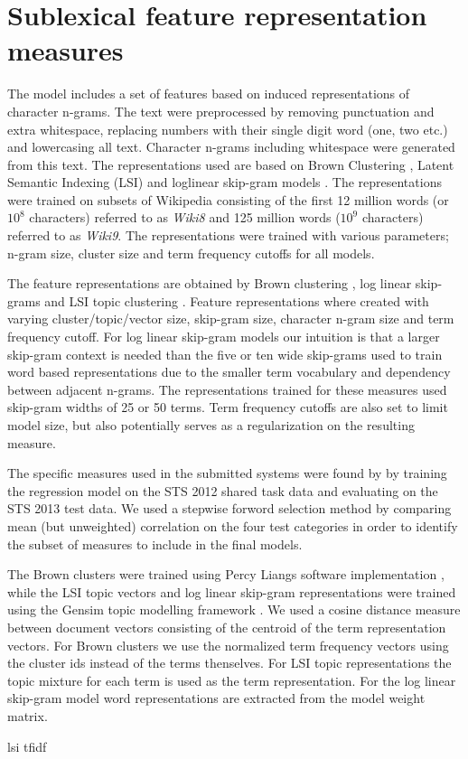 \section{Sublexical feature representation measures}
\label{subrep-features}

The model includes a set of features based on induced representations of character n-grams. The text were preprocessed by removing punctuation and extra whitespace, replacing numbers with their single digit word (one, two etc.) and lowercasing all text. Character n-grams including whitespace were generated from this text. The representations used are based on Brown Clustering \cite{}, Latent Semantic Indexing (LSI) \cite{} and loglinear skip-gram models \cite{}. The representations were trained on subsets of Wikipedia consisting of the first 12 million words (or $10^8$ characters) referred to as {\it Wiki8} and 125 million words ($10^9$ characters) referred to as {\it Wiki9}. The representations were trained with various parameters;  n-gram size, cluster size and term frequency cutoffs for all models.

The feature representations are obtained by Brown clustering \cite{brown1992class}, log linear skip-grams \cite{mikolov2013efficient} and LSI topic clustering \cite{deerwester1990indexing}. Feature representations where created with varying cluster/topic/vector size, skip-gram size, character n-gram size and term frequency cutoff. For log linear skip-gram models our intuition is that a larger skip-gram context is needed than the five or ten wide skip-grams used to train word based representations due to the smaller term vocabulary and dependency between adjacent n-grams. The representations trained for these measures used skip-gram widths of 25 or 50 terms. Term frequency cutoffs are also set to limit model size, but also potentially serves as a regularization on the resulting measure.

The specific measures used in the submitted systems were found by by training the regression model on the STS 2012 shared task data and evaluating on the STS 2013 test data. We used a stepwise forword selection method by comparing mean (but unweighted) correlation on the four test categories in order to identify the subset of measures to include in the final models.

The Brown clusters were trained using Percy Liangs software implementation \cite{liang2005semi}, while the LSI topic vectors and log linear skip-gram representations were trained using the Gensim topic modelling framework \cite{gensim_lrec}. We used a cosine distance measure between document vectors consisting of the centroid of the term representation vectors. For Brown clusters we use the normalized term frequency vectors using the cluster ids instead of the terms thenselves. For LSI topic representations the topic mixture for each term is used as the term representation. For the log linear skip-gram model word representations are extracted from the model weight matrix.

lsi tfidf


